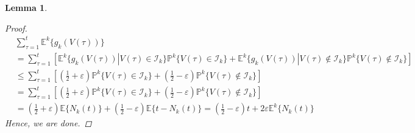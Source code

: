 \documentclass[12pt,draftcls, onecolumn]{IEEEtran}
\newtheorem{lemma}{Lemma}
\begin{document}
{\begin{lemma}
\begin{proof}
\begin{align}
    &\sum_{\tau = 1}^t \mathbb{E}^k\{g_k(V(\tau))\} \nonumber\\&= \sum_{\tau = 1}^t \left[\mathbb{E}^k\{g_k(V(\tau))|V(\tau) \in \mathcal{I}_k\}\mathbb{P}^k\{V(\tau) \in \mathcal{I}_k\}+\mathbb{E}^k\{g_k(V(\tau))|V(\tau) \not\in \mathcal{I}_k\}\mathbb{P}^k\{V(\tau) \not\in \mathcal{I}_k\} \right]\nonumber\\& \leq \sum_{\tau = 1}^t\left[ \left(\frac{1}{2}+\varepsilon \right)\mathbb{P}^k\{V(\tau) \in \mathcal{I}_k\}+\left(\frac{1}{2}-\varepsilon \right)\mathbb{P}^k\{V(\tau) \not\in \mathcal{I}_k\} \right]\nonumber\\& = \sum_{\tau = 1}^t\left[ \left(\frac{1}{2}+\varepsilon \right)\mathbb{P}^k\{V(\tau) \in \mathcal{I}_k\}+\left(\frac{1}{2}-\varepsilon \right)\mathbb{P}^k\{V(\tau) \not\in \mathcal{I}_k\} \right] \nonumber\\& = \left(\frac{1}{2}+\varepsilon \right)\mathbb{E}\{N_k(t)\}+\left(\frac{1}{2}-\varepsilon \right)\mathbb{E}\{t-N_k(t)\} = \left(\frac{1}{2}-\varepsilon \right)t + 2\varepsilon \mathbb{E}^k\{N_k(t)\}
\end{align}
Hence, we are done.
\end{proof}
\end{lemma}

}
\end{document}
